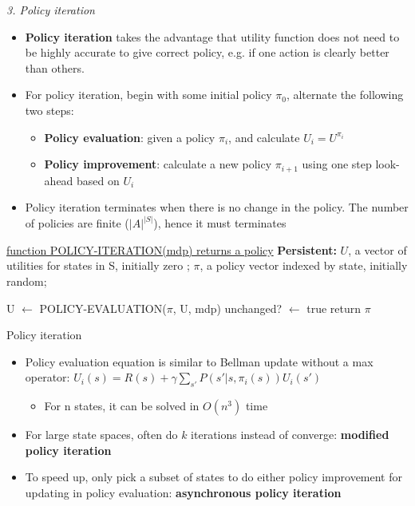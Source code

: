 \documentclass[12pt]{article}
\begin{document}
\noindent
\textsl{3. Policy iteration}
\begin{itemize}
\item \textbf{Policy iteration} takes the advantage that utility function does not need to be highly accurate to give correct policy, e.g. if one action is clearly better than others. 
\item For policy iteration, begin with some initial policy $\pi_0$, alternate the following two steps:
\begin{itemize}
\item \textbf{Policy evaluation}: given a policy $\pi_i$, and calculate $U_i = U^{\pi_i}$ 
\item \textbf{Policy improvement}: calculate a new policy $\pi_{i+1}$ using one step look-ahead based on $U_i$
\end{itemize}
\item Policy iteration terminates when there is no change in the policy. The number of policies are finite ($|A|^{|S|}$), hence it must terminates
\end{itemize}

\begin{algorithm}

    \underline{function POLICY-ITERATION(mdp) returns a policy} \;
    \Output{$\pi$}
    \textbf{Persistent:} 
    {$U$}, a vector of utilities for states in S, initially zero ; 
    $\pi$, a policy vector indexed by state, initially random; 
   
   {
      U $\gets$ POLICY-EVALUATION($\pi$, U, mdp)\;
      unchanged? $\gets$ true \;
         }
      return $\pi$
      \caption{Policy iteration}
\end{algorithm}

\begin{itemize}
\item Policy evaluation equation is similar to Bellman update without a max operator: $U_i(s) = R(s) + \gamma  \sum_{s'}^{}P(s' | s, \pi_i(s))U_i(s')$
\begin{itemize}
\item For n states, it can be solved in $O(n^3)$ time
\end{itemize}
\item For large state spaces, often do $k$ iterations instead of converge: \textbf{modified policy iteration}
\item To speed up, only pick a subset of states to do either policy improvement for updating in policy evaluation: \textbf{asynchronous policy iteration}
\end{itemize}
\end{document}
